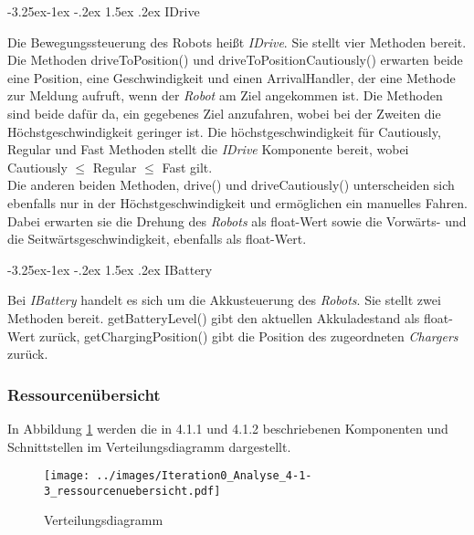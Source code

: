 \documentclass[includeheaders]{scrartcl}
\makeatletter
\renewcommand\subparagraph{\@startsection{subparagraph}{5}{\z@}%
	{-3.25ex\@plus -1ex \@minus -.2ex}%
	{1.5ex \@plus .2ex}%
	{\raggedsection\normalfont\sectfont\size@subparagraph\mdseries}%
}
\makeatother
\begin{document}
			\subparagraph{IDrive}\label{idrive}

			Die Bewegungssteuerung des Robots heißt \emph{IDrive}. Sie stellt vier
			Methoden bereit. Die Methoden driveToPosition() und
			driveToPositionCautiously() erwarten beide eine Position, eine
			Geschwindigkeit und einen ArrivalHandler, der eine Methode zur Meldung
			aufruft, wenn der \emph{Robot} am Ziel angekommen ist. Die Methoden sind
			beide dafür da, ein gegebenes Ziel anzufahren, wobei bei der Zweiten die
			Höchstgeschwindigkeit geringer ist. Die höchstgeschwindigkeit für
			Cautiously, Regular und Fast Methoden stellt die \emph{IDrive}
			Komponente bereit, wobei Cautiously $\leq$ Regular $\leq$ Fast gilt.\\
			Die anderen beiden Methoden, drive() und driveCautiously() unterscheiden
			sich ebenfalls nur in der Höchstgeschwindigkeit und ermöglichen ein
			manuelles Fahren. Dabei erwarten sie die Drehung des \emph{Robots} als
			float-Wert sowie die Vorwärts- und die Seitwärtsgeschwindigkeit,
			ebenfalls als float-Wert.

			\subparagraph{IBattery}\label{ibattery}

			Bei \emph{IBattery} handelt es sich um die Akkusteuerung des
			\emph{Robots}. Sie stellt zwei Methoden bereit. getBatteryLevel() gibt
			den aktuellen Akkuladestand als float-Wert zurück, getChargingPosition()
			gibt die Position des zugeordneten \emph{Chargers} zurück.

			\subsubsection{Ressourcenübersicht}
			In Abbildung \ref{fig:4-1-3-verteilungsdiagramm} werden die in 4.1.1 und 4.1.2 beschriebenen
			Komponenten und Schnittstellen im Verteilungsdiagramm dargestellt.

			\begin{figure}[H]
				\centering
				\texttt{[image: ../images/Iteration0\_Analyse\_4-1-3\_ressourcenuebersicht.pdf]}
				\caption{Verteilungsdiagramm}
				\label{fig:4-1-3-verteilungsdiagramm}
			\end{figure}
					
\end{document}

